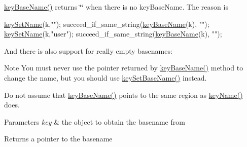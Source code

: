\hyperlink{group__keyname_gaaff35e7ca8af5560c47e662ceb9465f5}{key\-Base\-Name()} returns \char`\"{}\char`\"{} when there is no key\-Base\-Name. The reason is 
\begin{DoxyCodeInclude}
\hyperlink{group__keyname_ga7699091610e7f3f43d2949514a4b35d9}{keySetName}(k,\textcolor{stringliteral}{""});
succeed\_if\_same\_string(\hyperlink{group__keyname_gaaff35e7ca8af5560c47e662ceb9465f5}{keyBaseName}(k), \textcolor{stringliteral}{""});
\hyperlink{group__keyname_ga7699091610e7f3f43d2949514a4b35d9}{keySetName}(k,\textcolor{stringliteral}{"user"});
succeed\_if\_same\_string(\hyperlink{group__keyname_gaaff35e7ca8af5560c47e662ceb9465f5}{keyBaseName}(k), \textcolor{stringliteral}{""});
\end{DoxyCodeInclude}
 And there is also support for really empty basenames\-: 
 \begin{DoxyNote}{Note}
You must never use the pointer returned by \hyperlink{group__keyname_gaaff35e7ca8af5560c47e662ceb9465f5}{key\-Base\-Name()} method to change the name, but you should use \hyperlink{group__keyname_ga6e804bd453f98c28b0ff51430d1df407}{key\-Set\-Base\-Name()} instead.

Do not assume that \hyperlink{group__keyname_gaaff35e7ca8af5560c47e662ceb9465f5}{key\-Base\-Name()} points to the same region as \hyperlink{group__keyname_ga8e805c726a60da921d3736cda7813513}{key\-Name()} does.
\end{DoxyNote}

\begin{DoxyParams}{Parameters}
{\em key} & the object to obtain the basename from \\
\hline
\end{DoxyParams}
\begin{DoxyReturn}{Returns}
a pointer to the basename 
\end{DoxyReturn}

